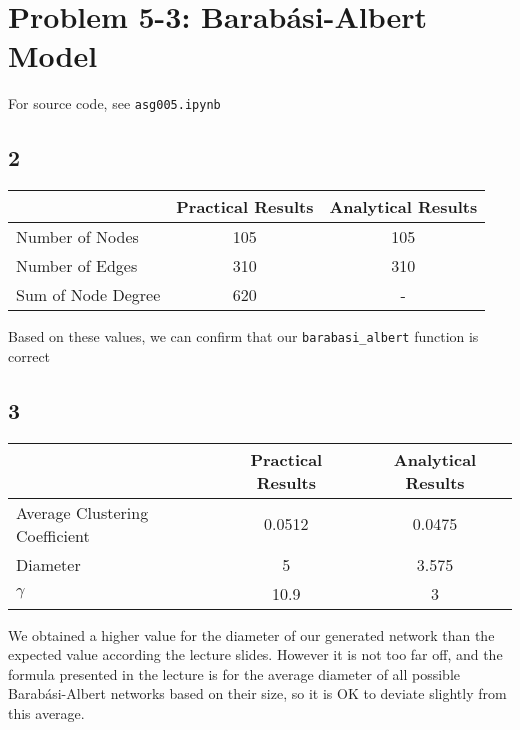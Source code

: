 \documentclass {article}
\begin{document}
\newpage
\section*{Problem 5-3: Barabási-Albert Model}

For source code, see \texttt{asg005.ipynb}

\subsection*{2}

\begin{tabular}{l | c c }
    & Practical Results & Analytical Results \\
\hline
Number of Nodes& 105 & 105 \\
Number of Edges& 310 & 310\\
Sum of Node Degree& 620 &  -
\end{tabular}
\medskip

Based on these values, we can confirm that our \texttt{barabasi\_albert} function is correct

\subsection*{3}

\begin{tabular}{l | c c }
    & Practical Results & Analytical Results \\
\hline
Average Clustering Coefficient& 0.0512 & 0.0475 \\
Diameter                      & 5 & 3.575\\
$\gamma$                      & 10.9&  3

\end{tabular}
\medskip


We obtained a higher value for the diameter of our generated network than the expected value according the lecture slides. However it is not too far off, and the formula presented in the lecture is for the average diameter of all possible Barabási-Albert networks based on their size, so it is OK to deviate slightly from this average.
\end{document}
